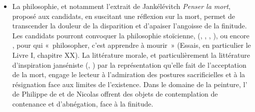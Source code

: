 {\begin{itemize}
\item La philosophie, et notamment l'extrait de Jankélévitch \emph{Penser la mort}, proposé aux
candidats, en suscitant une réflexion sur la mort, permet de transcender la douleur de
la disparition et d'apaiser l'angoisse de la finitude. Les candidats pourront convoquer
la philosophie stoïcienne, (, , , ), ou encore
, pour qui «~philosopher, c'est apprendre à mourir~» (Essais, en particulier
le Livre I, chapitre XX). La littérature morale, et particulièrement la littérature
d'inspiration janséniste (, ) par la représentation qu'elle
fait de l'acceptation de la mort, engage le lecteur à l'admiration des postures
sacrificielles et à la résignation face aux limites de l'existence. Dans le domaine de la
peinture, l' de Philippe de  et  de
Nicolas  offrent des objets de contemplation de contenance et d'abnégation,
face à la finitude.


\end{itemize}}
